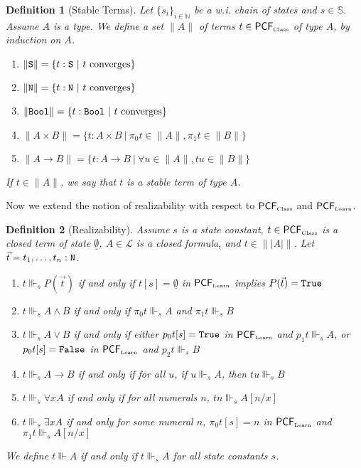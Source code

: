 \documentclass[copyright,creativecommons]{eptcs}
\newcommand{\Nat}                      { {\tt N} }
\newcommand{\Bool}                     { {\tt Bool} }
\newcommand{\State}                    { {\tt S} }
\newcommand{\NatSet}                   {\mathbb{N}}
\newcommand{\StateSet}                 {\mathbb{S}}
\newcommand{\True}                     { {\tt{True}} }
\newcommand{\False}                    { {\tt{False}} }
\newcommand{\Class}                    {\mbox{\tiny Class}}
\newcommand{\Learn}                    {\mbox{\tiny Learn}}
\newcommand{\proj}                     { {p} }
\newcommand{\makestate}      [1]       { {\underline{#1}} }
\newcommand{\PRclass}                    {{\mathsf{PCF}_{\Class}}}
\newcommand{\PRlearn}                    {{\mathsf{PCF}_{\Learn}}}
\newtheorem{definition}{Definition}
\begin{document}
\begin{definition}[Stable Terms]
\label{definition-StableTerms} Let
$\{s_i\}_{i\in\NatSet}$ be a w.i. chain of states and $s \in
\StateSet$. Assume $A$ is a
type. We define a set $\|A\|$ of terms
$t \in\PRclass$ of type $A$, by induction on $A$.
\begin{enumerate}

\item
$\|\State\|=\{t:\State \ |\ t\mbox{ converges}\}$

\item
$\|\Nat\|=\{t:\Nat \ |\ t\mbox{ converges}\}$

\item
$\|\Bool\|=\{t:\Bool \ |\ t\mbox{ converges}\}$

\item
$\|A\times B\|=\{t:A \times B \ |\
\pi_0t\in\|A\|,\pi_1t\in\|B\|\}$

\item
$\|A\rightarrow B\|=\{t:A\rightarrow B \ |\ \forall u\in
\|A\|, tu\in\|B\|\}$
\end{enumerate}

If $t\in\|A\|$, we say that $t$ is a {\em stable} term of type
$A$.
\end{definition}

Now we extend the notion of realizability with respect to $\PRclass$ and $\PRlearn$.


\begin{definition}[Realizability]
\label{lemma-IndexedRealizabilityAndRealizability2}
Assume $s$ is a state constant, $t\in \PRclass$ is a closed term of state $\makestate{\emptyset}$, $A \in \mathcal{L} $ is a closed formula, and $t\in \||A|\|$. Let $\vec{t} = t_1, \ldots, t_n : \Nat$.

\begin{enumerate}
\item
$t\Vvdash_s P(\vec{t})$ if and only if $t[s]  = \makestate{\emptyset}$ in $\PRlearn$ implies
$P(\vec{t})={\True}$


\item
$t\Vvdash_s{A\wedge B}$ if and only if $\pi_0t \Vvdash_s{A}$ and $\pi_1t\Vvdash_s{B}$

\item
$t\Vvdash_s {A\vee B}$  if and only if either $\proj_0t[{s}]={\True}$ in $\PRlearn$ and $\proj_1t\Vvdash_s A$, or $\proj_0t[{s}]={\False}$ in $\PRlearn$ and $\proj_2t\Vvdash_s B$

\item
$t\Vvdash_s {A\rightarrow B}$ if and only if for all $u$, if $u\Vvdash_s{A}$,
then $tu\Vvdash_s{B}$

\item
$t\Vvdash_s {\forall x A}$ if and only if for all numerals $n$,
$t{n}\Vvdash_s A[{n}/x]$
\item

$t\Vvdash_s \exists x A$ if and only for some numeral $n$, $\pi_0t[{s}]= {n}$ in $\PRlearn$ and $\pi_1t \Vvdash_s A[{n}/x]$
\end{enumerate}
We define $t \Vvdash A$ if and only if $t\Vvdash_s A$ for all state constants $s$.
\end{definition}
\end{document}
